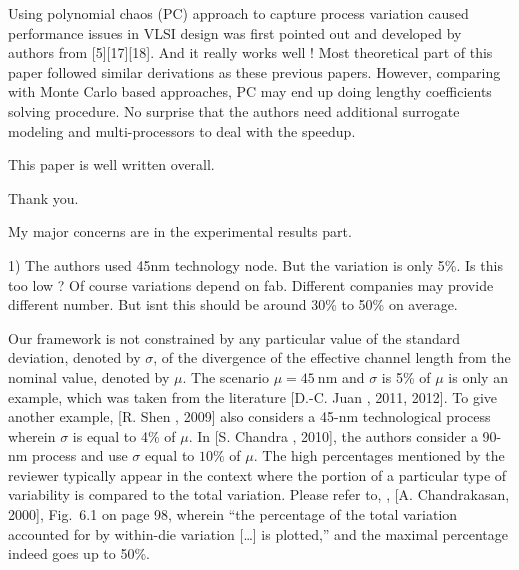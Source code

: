 \begin{reviewer}
Using polynomial chaos (PC) approach to capture process variation caused performance issues in VLSI design was first pointed out and developed by authors from [5][17][18]. And it really works well ! Most theoretical part of this paper followed similar derivations as these previous papers. However, comparing with Monte Carlo based approaches, PC may end up doing  lengthy  coefficients solving procedure. No surprise that the authors need additional surrogate modeling and multi-processors to deal with the speedup.

This paper is well written overall.
\end{reviewer}
\begin{authors}
Thank you.
\end{authors}

\begin{reviewer}
My major concerns are in the experimental results part.

1) The authors used 45nm technology node. But the variation is only 5\%. Is this too low ? Of course variations depend on fab. Different companies may provide different number. But isnt this should be around 30\% to 50\% on average.
\end{reviewer}
\begin{authors}
Our framework is not constrained by any particular value of the standard deviation, denoted by $\sigma$, of the divergence of the effective channel length from the nominal value, denoted by $\mu$.
The scenario $\mu = 45~\text{nm}$ and $\sigma$ is 5\% of $\mu$ is only an example, which was taken from the literature [D.-C. Juan \etal, 2011, 2012].
To give another example, [R. Shen \etal, 2009] also considers a 45-nm technological process wherein $\sigma$ is equal to 4\% of $\mu$.
In [S. Chandra \etal, 2010], the authors consider a 90-nm process and use $\sigma$ equal to $10\%$ of $\mu$.
The high percentages mentioned by the reviewer typically appear in the context where the portion of a particular type of variability is compared to the total variation.
Please refer to, \eg, [A. Chandrakasan, 2000], Fig.~6.1 on page 98, wherein ``the percentage of the total variation accounted for by within-die variation [\ldots] is plotted,'' and the maximal percentage indeed goes up to 50\%.

\end{authors}

